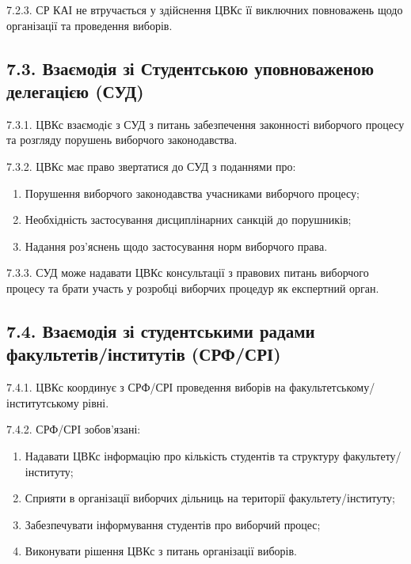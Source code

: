     7.2.3. СР КАІ не втручається у здійснення ЦВКс її виключних повноважень щодо організації та проведення виборів.

\subsection*{7.3. Взаємодія зі Студентською уповноваженою делегацією (СУД)}
    7.3.1. ЦВКс взаємодіє з СУД з питань забезпечення законності виборчого процесу та розгляду порушень виборчого законодавства.

    7.3.2. ЦВКс має право звертатися до СУД з поданнями про:

        \begin{enumerate}[label=\alph*)]
            \item Порушення виборчого законодавства учасниками виборчого процесу;
            \item Необхідність застосування дисциплінарних санкцій до порушників;
            \item Надання роз'яснень щодо застосування норм виборчого права.
        \end{enumerate}

    7.3.3. СУД може надавати ЦВКс консультації з правових питань виборчого процесу та брати участь у розробці виборчих процедур як експертний орган.

\subsection*{7.4. Взаємодія зі студентськими радами факультетів/інститутів (СРФ/СРІ)}
    7.4.1. ЦВКс координує з СРФ/СРІ проведення виборів на факультетському/інститутському рівні.

    7.4.2. СРФ/СРІ зобов'язані:

        \begin{enumerate}[label=\alph*)]
            \item Надавати ЦВКс інформацію про кількість студентів та структуру факультету/інституту;
            \item Сприяти в організації виборчих дільниць на території факультету/інституту;
            \item Забезпечувати інформування студентів про виборчий процес;
            \item Виконувати рішення ЦВКс з питань організації виборів.
        \end{enumerate}

